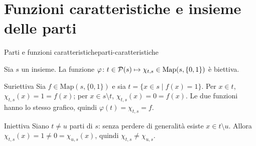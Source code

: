 \section{Funzioni caratteristiche e insieme delle parti}\label{sec:caratteristiche}


\begin{concetto}
\begin{Teorema}{Parti e funzioni caratteristiche}{parti-caratteristiche}
    \begin{prerequisiti}
    \end{prerequisiti}
    Sia $s$ un insieme. La funzione $\varphi \colon t \in \mathcal{P}(s) \mapsto \chi_{t, s} \in \mathrm{Map}(s, \{0, 1\})$ è biettiva.
\end{Teorema}
\begin{dimostrazione}
    \begin{caso}{Suriettiva}
        Sia $f \in \mathrm{Map}(s, \{0, 1\})$ e sia $t = \{x \in s \mid f(x) = 1\}$. Per $x \in t$, $\chi_{t, s}(x) = 1 = f(x)$; per $x \in s \setminus t$,
        $\chi_{t, s}(x) = 0 = f(x)$. Le due funzioni hanno lo stesso grafico, quindi $\varphi(t) = \chi_{t, s} = f$.
    \end{caso}
    \begin{caso}{Iniettiva}
        Siano $t \neq u$ parti di $s$: senza perdere di generalità esiste $x \in t \setminus u$. Allora $\chi_{t, s}(x) = 1 \neq 0 = \chi_{u, s}(x)$, quindi
        $\chi_{t, s} \neq \chi_{u, s}$.
    \end{caso}
\end{dimostrazione}
\end{concetto}

